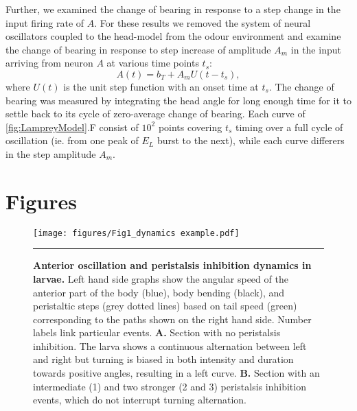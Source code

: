 \documentclass[11pt,a4paper]{article}
\begin{document}
Further, we examined the change of bearing in response to a step change in the input firing rate of $A$. For these results we removed the system of neural oscillators coupled to the head-model from the odour environment and examine the change of bearing in response to step increase of amplitude $A_m$ in the input arriving from neuron $A$ at various time points $t_s$:
\begin{equation}
A(t) = b_T + A_m U(t-t_s),
\end{equation}
where $U(t)$ is the unit step function with an onset time at $t_s$. The change of bearing was measured by integrating the head angle for long enough time for it to settle back to its cycle of zero-average change of bearing. Each curve of \ref{fig:LampreyModel}.F consist of $10^2$ points covering $t_s$ timing over a full cycle of oscillation (ie. from one peak of $E_L$ burst to the next), while each curve differers in the step amplitude $A_m$.


\newpage
\section{Figures}


\begin{figure}
\begin{center}
\texttt{[image: figures/Fig1\_dynamics example.pdf]}
\caption{{\bf Anterior oscillation and peristalsis inhibition dynamics in larvae.} 
Left hand side graphs show the angular speed of the anterior part of the body (blue), body bending (black), and peristaltic steps (grey dotted lines) based on tail speed (green) corresponding to the paths shown on the right hand side. Number labels link particular events. 
{\bf A.} Section with no peristalsis inhibition. The larva shows a continuous alternation between left and right but turning is biased in both intensity and duration towards positive angles, resulting in a left curve.
{\bf B.} Section with an intermediate (1) and two stronger (2 and 3) peristalsis inhibition events, which do not interrupt turning alternation.
\label{fig:DynamicsExample}
}
\hrule
\end{center}
\end{figure}
\end{document}
